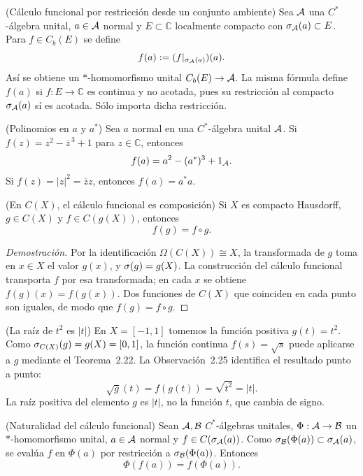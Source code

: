 \begin{cthdefinicion}{(Cálculo funcional por restricción desde un conjunto ambiente)}
Sea $\mathcal A$ una $C^*$-álgebra unital, $a\in\mathcal A$ normal y $E\subset\mathbb C$
localmente compacto con $\sigma_\mathcal A(a)\subset E$. Para $f\in C_b(E)$ se define
\[
 f(a):=(f|_{\sigma_\mathcal A(a)})(a).
\]
Así se obtiene un $*$-homomorfismo unital $C_b(E)\to\mathcal A$. La misma fórmula
define $f(a)$ si $f:E\to\mathbb C$ es continua y no acotada, pues su restricción
al compacto $\sigma_\mathcal A(a)$ sí es acotada. Sólo importa dicha restricción.
\end{cthdefinicion}

\begin{cthobservacion}{(Polinomios en $a$ y $a^*$)}
Sea $a$ normal en una $C^*$-álgebra unital $\mathcal A$. Si
$f(z)=z^2-\overline z^{\,3}+1$ para $z\in\mathbb C$, entonces
\[
 f(a)=a^2-(a^*)^3+1_\mathcal A.
\]
Si $f(z)=|z|^2=\overline z z$, entonces $f(a)=a^*a$.
\end{cthobservacion}

\begin{cthobservacion}{(En $C(X)$, el cálculo funcional es composición)}
Si $X$ es compacto Hausdorff, $g\in C(X)$ y $f\in C(g(X))$, entonces
\[
 f(g)=f\circ g.
\]
\end{cthobservacion}

\begin{proof}[Demostración]
Por la identificación $\Omega(C(X))\cong X$, la transformada de $g$ toma en
$x\in X$ el valor $g(x)$, y $\sigma(g)=g(X)$. La construcción del cálculo
funcional transporta $f$ por esa transformada; en cada $x$ se obtiene
$f(g)(x)=f(g(x))$. Dos funciones de $C(X)$ que coinciden en cada punto son
iguales, de modo que $f(g)=f\circ g$.
\end{proof}

\begin{cthejemplo}{(La raíz de $t^2$ es $|t|$)}
En $X=[-1,1]$ tomemos la función positiva $g(t)=t^2$.
Como $\sigma_{C(X)}(g)=g(X)=[0,1]$, la función continua
$f(s)=\sqrt s$ puede aplicarse a $g$ mediante el Teorema~2.22.
La Observación~2.25 identifica el resultado punto a punto:
\[
 \sqrt g(t)=f(g(t))=\sqrt{t^2}=|t|.
\]
La raíz positiva del elemento $g$ es $|t|$, no la función $t$,
que cambia de signo.
\end{cthejemplo}

\begin{cthlema}{(Naturalidad del cálculo funcional)}
Sean $\mathcal A,\mathcal B$ $C^*$-álgebras unitales, $\Phi:\mathcal A\to\mathcal B$ un $*$-homomorfismo unital,
$a\in\mathcal A$ normal y $f\in C(\sigma_\mathcal A(a))$. Como
$\sigma_\mathcal B(\Phi(a))\subset\sigma_\mathcal A(a)$, se evalúa $f$ en $\Phi(a)$ por
restricción a $\sigma_\mathcal B(\Phi(a))$. Entonces
\[
 \Phi(f(a))=f(\Phi(a)).
\]
\end{cthlema}

